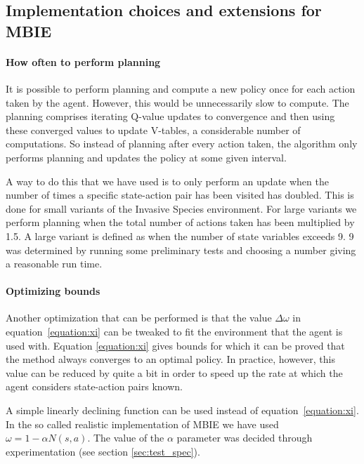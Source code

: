 \subsection{Implementation choices and extensions for MBIE}
\label{sec:MBIE_our_contribution}

\paragraph{How often to perform planning}
\label{sec:mbie_perform_planning}

It is possible to perform planning and compute a new policy once for each
action taken by the agent. However, this would be unnecessarily slow to
compute. The planning comprises iterating Q-value updates to convergence and
then using these converged values to update V-tables, a considerable number of
computations. So instead of planning after every action taken, the algorithm
only performs planning and updates the policy at some given interval. 

A way to do this that we have used is to only perform an update when the number
of times a specific state-action pair has been visited has doubled. This is
done for small variants of the Invasive Species environment. For large variants
we perform planning when the total number of actions taken has been multiplied
by 1.5. A large variant is defined as when the number of state variables
exceeds 9. 9 was determined by running some preliminary tests and
choosing a number giving a reasonable run time.

\paragraph{Optimizing bounds}

Another optimization that can be performed is that the value $\Delta \omega$ in
equation~\eqref{equation:xi} can be tweaked to fit the environment that the
agent is used with. Equation \eqref{equation:xi} gives bounds for which it can
be proved that the method always converges to an optimal policy. In practice,
however, this value can be reduced by quite a bit in order to speed up the rate
at which the agent considers state-action pairs known. 

A simple linearly declining function can be used instead of
equation~\eqref{equation:xi}. In the so called realistic implementation of MBIE we have
used $\omega = 1 - \alpha N(s,a).$ The value of the $\alpha$ parameter was decided through experimentation (see section \ref{sec:test_spec}).


